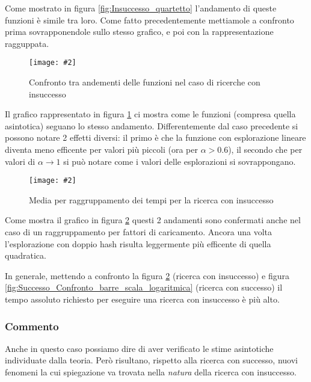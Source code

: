 \documentclass{article}
\newcommand{\image}[3][1]{
	\centering
	\texttt{[image: \#2]}
	\caption{#3}
}
\begin{document}
Come mostrato in figura \ref{fig:Insuccesso_quartetto} l'andamento di queste funzioni è simile tra loro. Come fatto precedentemente mettiamole a confronto prima sovrapponendole sullo stesso grafico, e poi con la rappresentazione ragguppata.  

\begin{figure}[H]
\image[0.75]{Insuccesso_Confronto_Asintotico_scala_logaritmica}{Confronto tra andementi delle funzioni nel caso di ricerche con insuccesso}
\label{fig:Insuccesso_Confronto_Asintotico_scala_logaritmica}
\end{figure}

Il grafico rappresentato in figura \ref{fig:Insuccesso_Confronto_Asintotico_scala_logaritmica} ci mostra come le funzioni (compresa quella asintotica) seguano lo stesso andamento. Differentemente dal caso precedente si possono notare 2 effetti diversi: il primo è che la funzione con esplorazione lineare diventa meno efficente per valori più piccoli (ora per $\alpha > 0.6$), il secondo che per valori di $\alpha \longrightarrow 1$ si può notare come i valori delle esplorazioni si sovrappongano.

\begin{figure}[H]
\image[0.75]{Insuccesso_Confronto_barre_scala_logaritmica}{Media per raggruppamento dei tempi per la ricerca con insuccesso}
\label{fig:Insuccesso_Confronto_barre_scala_logaritmica}
\end{figure}

Come mostra il grafico in figura \ref{fig:Insuccesso_Confronto_barre_scala_logaritmica} questi 2 andamenti sono confermati anche nel caso di un raggruppamento per fattori di caricamento. Ancora una volta l'esplorazione con doppio hash risulta leggermente più efficente di quella quadratica.

In generale, mettendo a confronto la figura \ref{fig:Insuccesso_Confronto_barre_scala_logaritmica} (ricerca con insuccesso) e figura \ref{fig:Successo_Confronto_barre_scala_logaritmica} (ricerca con successo) il tempo assoluto richiesto per eseguire una ricerca con insuccesso è più alto.

\subsubsection{Commento}
Anche in questo caso possiamo dire di aver verificato le stime asintotiche individuate dalla teoria. Però risultano, rispetto alla ricerca con successo, nuovi fenomeni la cui spiegazione va trovata nella \emph{natura} della ricerca con insuccesso.
\end{document}

